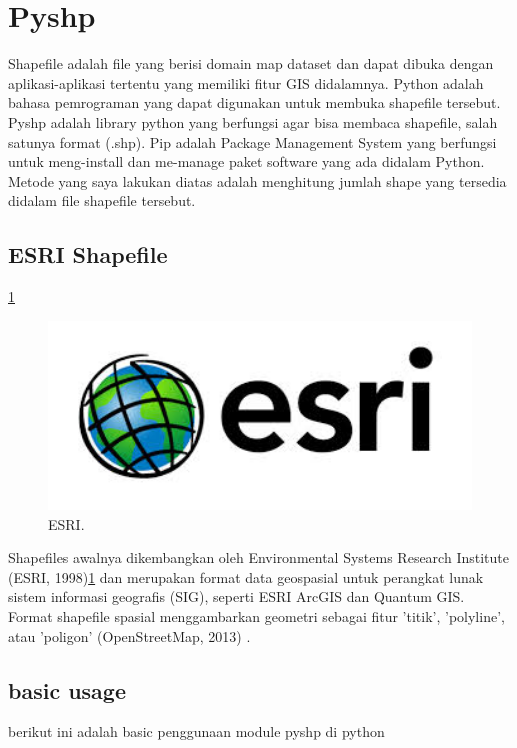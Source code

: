 
\section{Pyshp}
Shapefile adalah file yang berisi domain map dataset dan dapat dibuka dengan aplikasi-aplikasi tertentu yang memiliki fitur GIS didalamnya.
Python adalah bahasa pemrograman yang dapat digunakan untuk membuka shapefile tersebut.
Pyshp adalah library python yang berfungsi agar bisa membaca shapefile, salah satunya format (.shp).
Pip adalah Package Management System yang berfungsi untuk meng-install dan me-manage paket software yang ada didalam Python.
Metode yang saya lakukan diatas adalah menghitung jumlah shape yang tersedia didalam file shapefile tersebut.

\subsection{ESRI Shapefile}
\ref{esri}
	\begin{figure}[ht]
	\centerline{\includegraphics[width=1\textwidth]{figures/esri.JPG}}
	\caption{ESRI.}
	\label{esri}
	\end{figure}

Shapefiles awalnya dikembangkan oleh Environmental Systems Research Institute (ESRI, 1998)\ref{esri} dan merupakan format data geospasial untuk perangkat lunak sistem informasi geografis (SIG), seperti ESRI ArcGIS dan Quantum GIS.
Format shapefile spasial menggambarkan geometri sebagai fitur 'titik', 'polyline', atau 'poligon' (OpenStreetMap, 2013) \cite{halchuk2014fifth}.

\subsection{basic usage}
berikut ini adalah basic penggunaan module pyshp di python

